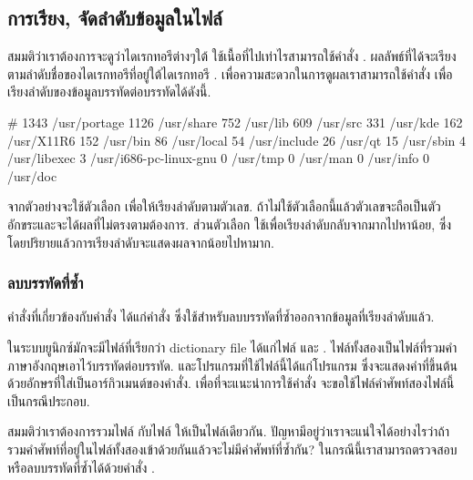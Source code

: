 \begin{thwbr}
\subsection{การเรียง, จัดลำดับข้อมูลในไฟล์}
สมมติว่าเราต้องการจะดูว่าไดเรกทอรีต่างๆใต้  ใช้เนื้อที่ไปเท่าไรสามารถใช้คำสั่ง . ผลลัพธ์ที่ได้จะเรียงตามลำดับชื่อของไดเรกทอรีที่อยู่ใต้ไดเรกทอรี . เพื่อความสะดวกในการดูผลเราสามารถใช้คำสั่ง  เพื่อเรียงลำดับของข้อมูลบรรทัดต่อบรรทัดได้ดังนี้.
\begin{MyExample}
\begin{MyEx}
# 
1343    /usr/portage
1126    /usr/share
752     /usr/lib
609     /usr/src
331     /usr/kde
162     /usr/X11R6
152     /usr/bin
86      /usr/local
54      /usr/include
26      /usr/qt
15      /usr/sbin
4       /usr/libexec
3       /usr/i686-pc-linux-gnu
0       /usr/tmp
0       /usr/man
0       /usr/info
0       /usr/doc
\end{MyEx}
\end{MyExample}
จากตัวอย่างจะใช้ตัวเลือก  เพื่อให้เรียงลำดับตามตัวเลข. ถ้าไม่ใช้ตัวเลือกนี้แล้วตัวเลขจะถือเป็นตัวอักขระและจะได้ผลที่ไม่ตรงตามต้องการ. ส่วนตัวเลือก  ใช้เพื่อเรียงลำดับกลับจากมากไปหาน้อย, ซึ่งโดยปริยายแล้วการเรียงลำดับจะแสดงผลจากน้อยไปหามาก.

\subsubsection{ลบบรรทัดที่ซ้ำ}
คำสั่งที่เกี่ยวข้องกับคำสั่ง  ได้แก่คำสั่ง  ซึ่งใช้สำหรับลบบรรทัดที่ซ้ำออกจากข้อมูลที่เรียงลำดับแล้ว. 

ในระบบยูนิกซ์มักจะมีไฟล์ที่เรียกว่า dictionary file ได้แก่ไฟล์  และ . ไฟล์ทั้งสองเป็นไฟล์ที่รวมคำภาษาอังกฤษเอาไว้บรรทัดต่อบรรทัด. และโปรแกรมที่ใช้ไฟล์นี้ได้แก่โปรแกรม  ซึ่งจะแสดงคำที่ขึ้นต้นด้วยอักษรที่ใส่เป็นอาร์กิวเมนต์ของคำสั่ง. เพื่อที่จะแนะนำการใช้คำสั่ง  จะขอใช้ไฟล์คำศัพท์สองไฟล์นี้เป็นกรณีประกอบ.

สมมติว่าเราต้องการรวมไฟล์  กับไฟล์  ให้เป็นไฟล์เดียวกัน. ปัญหามีอยู่ว่าเราจะแน่ใจได้อย่างไรว่าถ้ารวมคำศัพท์ที่อยู่ในไฟล์ทั้งสองเข้าด้วยกันแล้วจะไม่มีคำศัพท์ที่ซ้ำกัน? ในกรณีนี้เราสามารถตรวจสอบหรือลบบรรทัดที่ซ้ำได้ด้วยคำสั่ง .


\end{thwbr}
